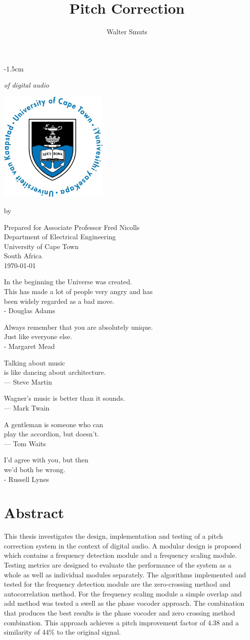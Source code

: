 \documentclass[12pt, twoside, openright]{report}
\title{Pitch Correction}
\author{Walter Smuts}
\makeatletter
\newcounter{quoteCounter}
\newcommand\addQuote{
\begin{center}

	\ifnum\thequoteCounter=1
		In the beginning the Universe was created.\\
		This has made a lot of people very angry and has\\
		been widely regarded as a bad move.\\
		\vspace{1cm}
		- Douglas Adams
	\fi

	\ifnum\thequoteCounter=2
		Always remember that you are absolutely unique.\\
		Just like everyone else.\\
		\vspace{1cm}
		- Margaret Mead
	\fi

	\ifnum\thequoteCounter=3
		Talking about music\\
		is like dancing about architecture.\\
		\vspace{1cm}
		 — Steve Martin
	\fi


	\ifnum\thequoteCounter=4
		Wagner’s music is better than it sounds.\\
		\vspace{1cm}
		— Mark Twain
	\fi

	\ifnum\thequoteCounter=5
		A gentleman is someone who can\\
		play the accordion,
		but doesn't.\\
		\vspace{1cm}
		— Tom Waits
	\fi

	\ifnum\thequoteCounter=6
		I'd agree with you, but then\\
		we'd both be wrong.\\
		\vspace{1cm}
		- Russell Lynes
	\fi

	\stepcounter{quoteCounter}

	\ifnum\thequoteCounter=7
		\setcounter{quoteCounter}{1}
	\fi

\end{center}

}
\newcommand{\frontpageoffset}{-1.5cm}
\newcommand{\frontpageoffset}{0cm}
\def\cleardoublepage{\clearpage\if@twoside \ifodd\c@page\else
\hbox{}
\vspace*{\fill}
\begin{center}
	\it \addQuote
\end{center}
\vspace{\fill}
\thispagestyle{empty}
\newpage
\if@twocolumn\hbox{}\newpage\fi\fi\fi}
\makeatother
\begin{document}
\makeatletter
\let\TITLE\@title
\makeatother

\null
\thispagestyle{empty}
\newpage

\begin{titlepage}
\begin{adjustwidth*}{}{\frontpageoffset} %
\begin{center}
	\vspace*{4cm}

	{\Huge\textbf\thetitle}

	{\it of digital audio}

	\vspace{0.8cm}
	\includegraphics[width=0.4\textwidth]{UCT.jpg}
	\vspace{0.8cm}

	by \theauthor
	\vspace{0.8cm}

	Prepared for Associate Professor Fred Nicolls\\
	Department of Electrical Engineering\\
	University of Cape Town\\
	South Africa\\
	\vspace{2cm}
	\today
\end{center}
\end{adjustwidth*}
\end{titlepage}
\cleardoublepage

\setcounter{page}{1}

\null
\vfill

\section*{\center Abstract}
\thispagestyle{plain}

This thesis investigates the design, implementation and testing of a pitch
correction system in the context of digital audio. A modular design is proposed
which contains a frequency detection module and a frequency scaling module.
Testing metrics are designed to evaluate the performance of the system as a whole
as well as individual modules separately. The algorithms implemented and tested
for the frequency detection module are the zero-crossing method and
autocorrelation method. For the frequency scaling module a simple overlap and add
method was tested a swell as the phase vocoder approach. The combination that
produces the best results is the phase vocoder and zero crossing method
combination. This approach achieves a pitch improvement factor of 4.38 and a
similarity of 44\% to the original signal.
\end{document}

